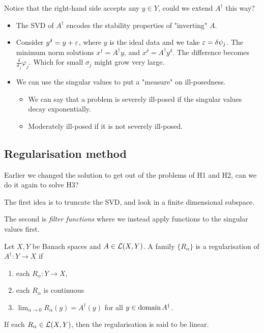 \documentclass[12pt]{article}
\begin{document}
Notice that the right-hand side accepts any $y\in Y$, could we extend $A^\dagger $ this way?
\begin{itemize}
    \item The SVD of $A^\dagger $ encodes the stability properties of "inverting" $A$.
    \item Consider $y^\delta = y +\varepsilon$, where $y$ is the ideal data and we take $\varepsilon = \delta \psi_j$. The minimum norm solutions $x^\dagger  = A^\dagger y$, and $x^\delta = A^\dagger y^\delta$. The difference becomes $\frac{\delta}{\sigma_j}\varphi_j$. Which for small $\sigma_j$ might grow very large.
    \item We can use the singular values to put a "measure" on ill-posedness.
    \begin{itemize}
        \item We can say that a problem is severely ill-posed if the singular values decay exponentially.
        \item Moderately ill-posed if it is not severely ill-posed.
    \end{itemize}
\end{itemize}

\subsection{Regularisation method}
Earlier we changed the solution to get out of the problems of H1 and H2, can we do it again to solve H3?

The first idea is to truncate the SVD, and look in a finite dimensional subspace.

The second is \textit{filter functions} where we instead apply functions to the singular values first.

\begin{definition}
    Let $X, Y$ be Banach spaces and $A\in \mathcal{L}(X,Y)$. A family $\{R_\alpha\}$ is a regularisation of $A^\dagger :Y\to X$ if 
    \begin{enumerate}[label=(\alph*)]
        \item each $R_\alpha:Y\to X$,
        \item each $R_\alpha$ is continuous
        \item $\lim_{\alpha\to 0} R_\alpha(y) = A^\dagger (y)$ for all $y\in \operatorname{domain} A^\dagger $.
    \end{enumerate}
    If each $R_\alpha\in\mathcal{L}(X,Y)$, then the regularisation is said to be linear.
\end{definition}
\end{document}
